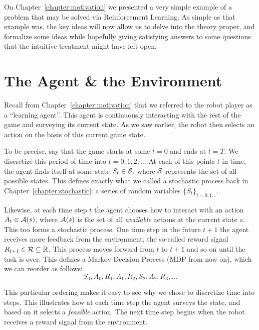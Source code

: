 
\label{chapter:ReinforcementLearning}

On Chapter~\ref{chapter:motivation} we presented a very simple 
example of a problem that may be solved via Reinforcement 
Learning. As simple as that example was, the key ideas will now 
allow us to delve into the theory proper, and formalize some 
ideas while hopefully giving satisfying answers to some 
questions that the intuitive treatment might have left open.

\section{The Agent \& the Environment}
Recall from Chapter~\ref{chapter:motivation} that we referred 
to the robot player as a ``learning agent''. This agent is 
continuously interacting with the rest of the game and 
surveying its current state. As we saw earlier, the robot then 
selects an action on the basis of this current game state.

To be precise, say that the game starts at some $t=0$ and ends 
at $t=T$. We discretize this period of time into $t = 0, 1, 2, 
\ldots$ At each of this points $t$ in time, the agent finds 
itself at some state $S_t \in \mathcal{S}$, where $\mathcal{S}$ 
represents the set of all possible states. This defines exactly 
what we called a stochastic process back in 
Chapter~\ref{chapter:stochastic}: a series of random variables 
$\{ S_t \}_{t = 0, 1 \ldots}$. 

Likewise, at each time step $t$ the agent chooses how to 
interact with an action $A_t \in \mathcal{A}(s)$, where 
$\mathcal{A}(s)$ is the set of all \textit{available} actions at 
the current state $s$. This too forms a stochastic process. One 
time step in the future $t+1$ the agent receives more feedback 
from the environment, the so-called reward signal $R_{t+1} \in 
\mathcal{R} \subseteq \mathbb{R}$. This process moves forward from $t$ to 
$t+1$ and so on until the task is over. This defines a Markov 
Decision Process (MDP from now on), which we can reorder as 
follows:
\begin{equation}
	S_0, A_0, R_1, A_1, R_2, S_2, A_2, R_3, \ldots
\end{equation}

This particular ordering makes it easy to see why we chose to 
discretize time into steps. This illustrates how at each time 
step the agent surveys the state, and based on it selects a 
\textit{feasible} action. The next time step begins when the 
robot receives a reward signal from the environment. 

